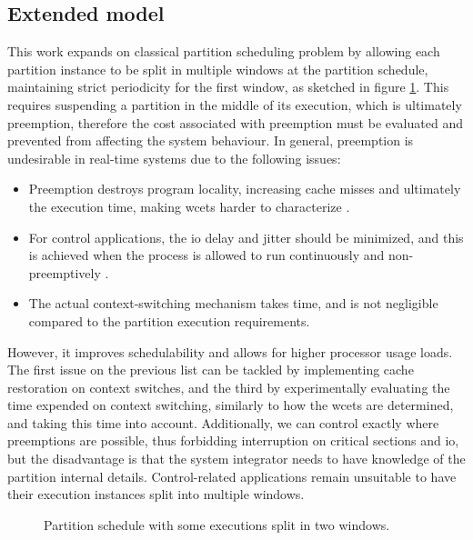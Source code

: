 \documentclass[main.tex]{subfiles}
\begin{document}
\subsection{Extended model}
\label{sec:extended}

This work expands on classical partition scheduling problem by allowing each partition instance to be split in multiple windows at the partition schedule, maintaining strict periodicity for the first window, as sketched in figure \ref{fig:preemption-scheme}.
This requires suspending a partition in the middle of its execution, which is ultimately preemption, therefore the cost associated with preemption must be evaluated and prevented from affecting the system behaviour.
In general, preemption is undesirable in real-time systems due to the following issues:
\begin{itemize}
	\item Preemption destroys program locality, increasing cache misses and ultimately the execution time, making \glspl{wcet} harder to characterize \cite{buttazzo2012limited}.
	\item For control applications, the \gls{io} delay and jitter should be minimized, and this is achieved when the process is allowed to run continuously and non-preemptively \cite{buttazzo2012limited}.
	\item The actual context-switching mechanism takes time, and is not negligible compared to the partition execution requirements.
\end{itemize}
However, it improves schedulability and allows for higher processor usage loads.
The first issue on the previous list can be tackled by implementing cache restoration on context switches, and the third by experimentally evaluating the time expended on context switching, similarly to how the \glspl{wcet} are determined, and taking this time into account.
Additionally, we can control exactly where preemptions are possible, thus forbidding interruption on critical sections and \gls{io}, but the disadvantage is that the system integrator needs to have knowledge of the partition internal details.
Control-related applications remain unsuitable to have their execution instances split into multiple windows.

 \begin{figure}[htbp]
	\centering
	\resizebox{0.7\linewidth}{!}{}
	\caption{Partition schedule with some executions split in two windows.}
	\label{fig:preemption-scheme}
\end{figure}
\end{document}

